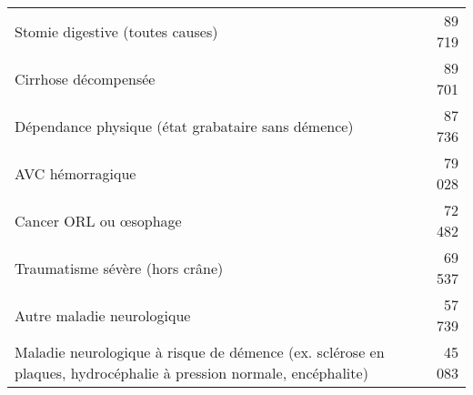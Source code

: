 \begin{tabular}{p{}r}
Stomie digestive (toutes causes) & 89 719 \\ 
Cirrhose décompensée & 89 701 \\ 
Dépendance physique (état grabataire sans démence) & 87 736 \\ 
AVC hémorragique & 79 028 \\ 
Cancer ORL ou œsophage & 72 482 \\ 
Traumatisme sévère (hors crâne) & 69 537 \\ 
Autre maladie neurologique & 57 739 \\ 
Maladie neurologique à risque de démence (ex. sclérose en plaques, hydrocéphalie à pression normale, encéphalite) & 45 083 \\ 
\bottomrule
\end{tabular}


